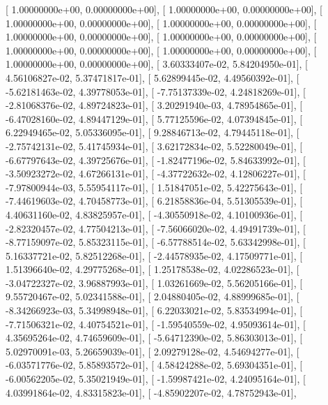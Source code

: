 \documentclass{article}
\begin{document}
       [  1.00000000e+00,   0.00000000e+00],
       [  1.00000000e+00,   0.00000000e+00],
       [  1.00000000e+00,   0.00000000e+00],
       [  1.00000000e+00,   0.00000000e+00],
       [  1.00000000e+00,   0.00000000e+00],
       [  1.00000000e+00,   0.00000000e+00],
       [  1.00000000e+00,   0.00000000e+00],
       [  1.00000000e+00,   0.00000000e+00],
       [  1.00000000e+00,   0.00000000e+00],
       [  3.60333407e-02,   5.84204950e-01],
       [  4.56106827e-02,   5.37471817e-01],
       [  5.62899445e-02,   4.49560392e-01],
       [ -5.62181463e-02,   4.39778053e-01],
       [ -7.75137339e-02,   4.24818269e-01],
       [ -2.81068376e-02,   4.89724823e-01],
       [  3.20291940e-03,   4.78954865e-01],
       [ -6.47028160e-02,   4.89447129e-01],
       [  5.77125596e-02,   4.07394845e-01],
       [  6.22949465e-02,   5.05336095e-01],
       [  9.28846713e-02,   4.79445118e-01],
       [ -2.75742131e-02,   5.41745934e-01],
       [  3.62172834e-02,   5.52280049e-01],
       [ -6.67797643e-02,   4.39725676e-01],
       [ -1.82477196e-02,   5.84633992e-01],
       [ -3.50923272e-02,   4.67266131e-01],
       [ -4.37722632e-02,   4.12806227e-01],
       [ -7.97800944e-03,   5.55954117e-01],
       [  1.51847051e-02,   5.42275643e-01],
       [ -7.44619603e-02,   4.70458773e-01],
       [  6.21858836e-04,   5.51305539e-01],
       [  4.40631160e-02,   4.83825957e-01],
       [ -4.30550918e-02,   4.10100936e-01],
       [ -2.82320457e-02,   4.77504213e-01],
       [ -7.56066020e-02,   4.49491739e-01],
       [ -8.77159097e-02,   5.85323115e-01],
       [ -6.57788514e-02,   5.63342998e-01],
       [  5.16337721e-02,   5.82512268e-01],
       [ -2.44578935e-02,   4.17509771e-01],
       [  1.51396640e-02,   4.29775268e-01],
       [  1.25178538e-02,   4.02286523e-01],
       [ -3.04722327e-02,   3.96887993e-01],
       [  1.03261669e-02,   5.56205166e-01],
       [  9.55720467e-02,   5.02341588e-01],
       [  2.04880405e-02,   4.88999685e-01],
       [ -8.34266923e-03,   5.34998948e-01],
       [  6.22033021e-02,   5.83534994e-01],
       [ -7.71506321e-02,   4.40754521e-01],
       [ -1.59540559e-02,   4.95093614e-01],
       [  4.35695264e-02,   4.74659609e-01],
       [ -5.64712390e-02,   5.86303013e-01],
       [  5.02970091e-03,   5.26659039e-01],
       [  2.09279128e-02,   4.54694277e-01],
       [ -6.03571776e-02,   5.85893572e-01],
       [  4.58424288e-02,   5.69304351e-01],
       [ -6.00562205e-02,   5.35021949e-01],
       [ -1.59987421e-02,   4.24095164e-01],
       [  4.03991864e-02,   4.83315823e-01],
       [ -4.85902207e-02,   4.78752943e-01],
\end{document}
